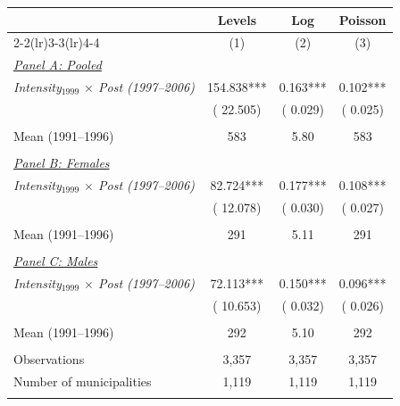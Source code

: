 \begin{tabular}{lccc} \hline \hline
& Levels & Log & Poisson \\ 
\cmidrule(lr){2-2}\cmidrule(lr){3-3}\cmidrule(lr){4-4}
& \multicolumn{1}{c}{(1)} & \multicolumn{1}{c}{(2)} & \multicolumn{1}{c}{(3)} \\ \toprule
\underline{\textit{Panel A: Pooled}}  \\ 
\textit{Intensity$_{1999}$ $\times$ Post (1997--2006)} &      154.838*** &        0.163*** &        0.102*** \\ 
  & (      22.505) & (       0.029) & (       0.025) \\ 
  & & &  \\ 
Mean (1991--1996)  &          583 &         5.80 &          583 \\ 
  & & &  \\ 
\underline{\textit{Panel B: Females}}  \\ 
\textit{Intensity$_{1999}$ $\times$ Post (1997--2006)}  &       82.724*** &        0.177*** &        0.108*** \\ 
  & (      12.078) & (       0.030) & (       0.027) \\ 
  & & &  \\ 
Mean (1991--1996)  &          291 &         5.11 &          291 \\ 
  & & &  \\ 
\underline{\textit{Panel C: Males}}  \\ 
\textit{Intensity$_{1999}$ $\times$ Post (1997--2006)} &       72.113*** &        0.150*** &        0.096*** \\ 
  & (      10.653) & (       0.032) & (       0.026) \\ 
  & & &  \\ 
Mean (1991--1996) &          292 &         5.10 &          292 \\ 
  & & &  \\ 
Observations &        3,357 &        3,357 &        3,357 \\ 
Number of municipalities &        1,119 &        1,119 &        1,119 \\ 
  & & & \\ 
\bottomrule
\end{tabular}